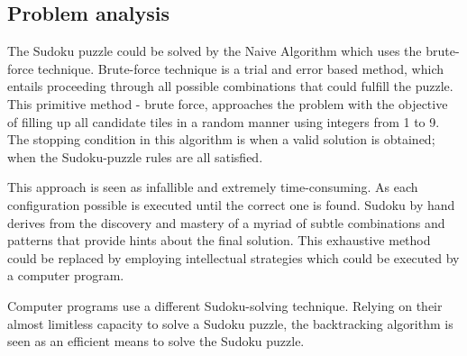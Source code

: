 \documentclass[12pt]{article}
\begin{document}
\subsection{Problem analysis}
\begin{flushleft}
The Sudoku puzzle could be solved by the Naive Algorithm which uses the brute-force technique. 
Brute-force technique is a trial and error based method, which entails proceeding through all possible combinations that could fulfill the puzzle. 
This primitive method - brute force, approaches the problem with the objective of filling up all candidate tiles in a random manner using integers from 1 to 9. The stopping condition in this algorithm is when a valid solution is obtained; when the Sudoku-puzzle rules are all satisfied. 

This approach is seen as infallible and extremely time-consuming. As each configuration possible is executed until the correct one is found. \newline
Sudoku by hand derives from the discovery and mastery of a myriad of subtle combinations and patterns that provide hints about the final solution.
This exhaustive method could be replaced by employing intellectual strategies which could be executed by a computer program. 
\newline

Computer programs use a different Sudoku-solving  technique. Relying on their almost limitless capacity to solve a Sudoku puzzle, the backtracking algorithm is seen as an efficient means to solve the Sudoku puzzle.



\end{flushleft}
\end{document}
